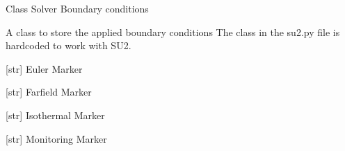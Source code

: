 \documentclass[letterpaper,10pt,english]{sphinxmanual}
\begin{document}
\begin{fulllineitems}
\label{\detokenize{modules:su2.Solver_BC}}
\pysigstartsignatures
{}
\pysigstopsignatures
\sphinxAtStartPar
Class Solver Boundary conditions

\sphinxAtStartPar
A class to store the applied boundary conditions
The class in the su2.py file is hardcoded to work with SU2.

\begin{fulllineitems}
\label{\detokenize{modules:su2.Solver_BC.euler}}
\pysigstartsignatures
{}
\pysigstopsignatures
\sphinxAtStartPar
{[}str{]} Euler Marker

\end{fulllineitems}


\begin{fulllineitems}
\label{\detokenize{modules:su2.Solver_BC.farfield}}
\pysigstartsignatures
{}
\pysigstopsignatures
\sphinxAtStartPar
{[}str{]} Farfield Marker

\end{fulllineitems}


\begin{fulllineitems}
\label{\detokenize{modules:su2.Solver_BC.iso}}
\pysigstartsignatures
{}
\pysigstopsignatures
\sphinxAtStartPar
{[}str{]} Isothermal Marker

\end{fulllineitems}


\begin{fulllineitems}
\label{\detokenize{modules:su2.Solver_BC.monitor}}
\pysigstartsignatures
{}
\pysigstopsignatures
\sphinxAtStartPar
{[}str{]} Monitoring Marker


\end{fulllineitems}
\end{fulllineitems}
\end{document}
